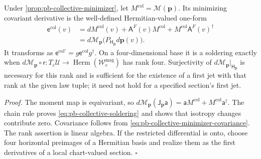 Under \cref{prop:pb-collective-minimizer}, let \(M^{\mathrm{col}}=\mathcal M(\boldsymbol p)\).
Its minimizing covariant derivative is the well-defined Hermitian-valued one-form
\begin{equation}
\begin{split}
\mathsf e^{\mathrm{col}}(v)
&=dM^{\mathrm{col}}(v)+\mathsf A^F(v)M^{\mathrm{col}}
+M^{\mathrm{col}}\mathsf A^F(v)^\dagger\\
&=d\mathcal M_{\boldsymbol p}\bigl(P_{\mathsf H_{\boldsymbol p}}d\boldsymbol p(v)\bigr).
\end{split}
\label{eq:pb-collective-soldering}
\end{equation}
It transforms as \(\mathsf e^{\mathrm{col}\prime}=g\mathsf e^{\mathrm{col}}g^\dagger\).
On a four-dimensional base it is a soldering exactly when
\(d\mathcal M_{\boldsymbol p}\circ\mathsf r:T_c\mathcal U\to
\operatorname{Herm}(\mathscr W_c^{\mathrm{msg}})\) has rank four. Surjectivity of
\(d\mathcal M_{\boldsymbol p}|_{\mathsf H_{\boldsymbol p}}\) is necessary for this rank and
is sufficient for the existence of a first jet with that rank at the given law tuple;
it need not hold for a specified section's first jet. 

\noindent\emph{Proof.}
The moment map is equivariant, so
\(d\mathcal M_{\boldsymbol p}(\mathsf J_{\boldsymbol p}\mathsf a)
=\mathsf aM^{\mathrm{col}}+M^{\mathrm{col}}\mathsf a^\dagger\).
The chain rule proves \cref{eq:pb-collective-soldering} and shows that isotropy changes contribute
zero. Covariance follows from \cref{eq:pb-collective-minimizer-covariance}. The rank assertion is
linear algebra. If the restricted differential is onto, choose four horizontal preimages of a
Hermitian basis and realize them as the first derivatives of a local chart-valued section.
\hfill$\square$

